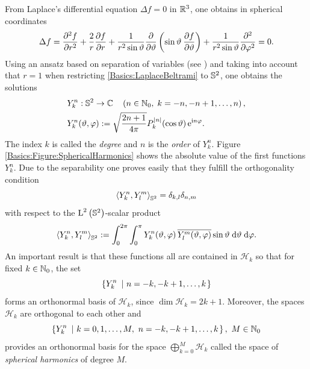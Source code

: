 From Laplace's differential equation $\Delta f = 0$ in $\mathbb{R}^3$, one obtains in spherical coordinates
\begin{equation}
  \label{Basics:LaplaceBeltrami}
  \Delta f = \frac{\partial^2 f}{\partial r^2} + \frac{2}{r}\frac{\partial f}{\partial
  r} + \frac{1}{r^2 \sin \vartheta}\frac{\partial}{\partial \vartheta}\left(\sin \vartheta \: \frac{\partial f}{\partial
  \vartheta}\right) + \frac{1}{r^2 \sin \vartheta}\frac{\partial^2}{\partial \varphi^2} = 0.
\end{equation}
Using an ansatz based on separation of variables (see \cite{co}) and taking into account that $r = 1$ when restricting 
\eqref{Basics:LaplaceBeltrami} to $\mathbb{S}^2$, one obtains the solutions
\begin{equation}
  \label{Basics:SphericalHarmonicsDefinition}
  \begin{split}
    & Y_{k}^n: \mathbb{S}^2 \rightarrow \mathbb{C} \quad \left(n \in \mathbb{N}_{0},\; k = -n,-n+1,\ldots,n\right),\\
    & Y_{k}^n{\hspace{-0.4ex}}\left(\vartheta,\varphi\right) := \sqrt{\frac{2n+1}{4\pi}} 
    P_{k}^{\left\vert n\right\vert}{\hspace{-0.4ex}}\left(\cos \vartheta\right) \mbox{\rm{e}}^{\mbox{\scriptsize\rm{i}} n \varphi}.
  \end{split}
\end{equation}
The index $k$ is called the \emph{degree} and $n$ is the \emph{order} of $Y_{k}^n$. 
Figure \ref{Basics:Figure:SphericalHarmonics} shows the absolute value of the first
functions $Y_{k}^{n}$.
Due to the separability one proves easily that they fulfill the orthogonality condition
\begin{equation}
  \nonumber
  \left<Y_{k}^n,Y_{l}^m\right>_{\mathbb{S}^2} = \delta_{k,l} \delta_{n,m}
\end{equation}
with respect to the $\text{\rm{L}}^{2}\left(\mathbb{S}^2\right)$-scalar product 
\begin{equation}
  \nonumber
  \left<Y_{k}^n,Y_{l}^m\right>_{\mathbb{S}^2} := \int_{0}^{2\pi} \int_{0}^{\pi} Y_{k}^n{\hspace{-0.4ex}}\left(\vartheta,\varphi\right) \overline{Y_{l}^m{\hspace{-0.4ex}}\left(\vartheta,\varphi\right)} \sin \vartheta \; \text{\rm{d}} \vartheta \; \text{\rm{d}} \varphi.
\end{equation}
An important result is that these functions all are contained in 
$\mathcal{H}_k$ so that for fixed $k \in \mathbb{N}_{0}$, the set
\begin{equation}
  \nonumber
  \left\{Y_{k}^n\ \left|\ n = -k,-k+1,\ldots,k\right.\right\rbrace
\end{equation}
forms an orthonormal basis of $ \mathcal{H}_k$, since $\dim \mathcal{H}_k =
2k+1$. Moreover, the spaces $\mathcal{H}_k$ are orthogonal
to each other and
$$\left\{Y_{k}^n\ \left|\ k = 0,1,\ldots,M,\ n = -k,-k+1,\ldots,k\right.\right\rbrace,\ M \in \mathbb{N}_{0}$$ 
provides an orthonormal basis for the space $\bigoplus_{k=0}^{M}\mathcal{H}_k$ called
the space of \emph{spherical harmonics} of degree $M$.

